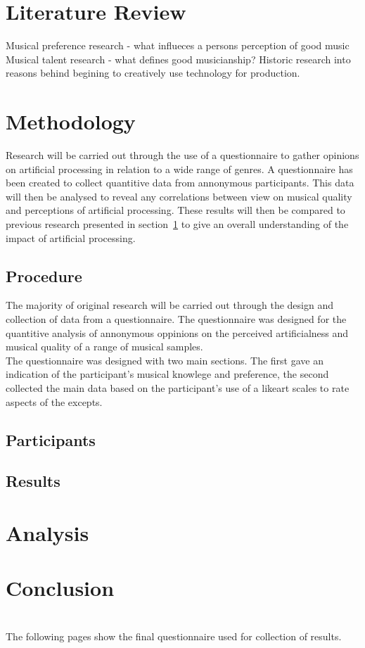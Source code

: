 \documentclass[titlepage]{scrartcl}
\begin{document}
    \section{Literature Review}\label{LR}
    Musical preference research - what influeces a persons perception of good
    music
    Musical talent research - what defines good musicianship?
    Historic research into reasons behind begining to creatively use technology for production.

    \section{Methodology}
    Research will be carried out through the use of a questionnaire to gather
    opinions on artificial processing in relation to a wide range of genres.
    A questionnaire has been created to collect quantitive data from annonymous
    participants. This data will then be analysed to reveal any correlations
    between view on musical quality and perceptions of artificial processing.
    These results will then be compared to previous research presented in
    section~\ref{LR} to give an overall understanding of the impact of
    artificial processing.

    \subsection{Procedure}
    The majority of original research will be carried out through the design
    and collection of data from a questionnaire. The questionnaire was designed
    for the quantitive analysis of annonymous oppinions on the perceived
    artificialness and musical quality of a range of musical samples.\\
    The questionnaire was designed with two main sections. The first gave an
    indication of the participant's musical knowlege and preference, the second
    collected the main data based on the participant's use of a likeart scales
    to rate aspects of the excepts.
    \subsection{Participants}
    \subsection{Results}

    \section{Analysis}

    \section{Conclusion}
    
    \printbibliography

    \appendix
    \gdef\thesection{\centerline{Appendix \Alph{section}}}
    \section{}
    The following pages show the final questionnaire used for collection of results. 
    
\end{document}
